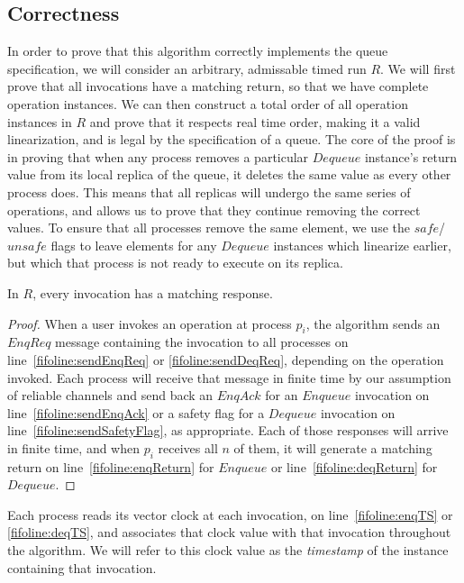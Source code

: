 \documentclass[a4paper,anonymous,USenglish]{lipics-v2021} %
\theoremstyle{definition}
\begin{document}
\subsection{Correctness}
In order to prove that this algorithm correctly implements the queue specification, we will consider an arbitrary, admissable timed run $R$.  We will first prove that all invocations have a matching return, so that we have complete operation instances.  We can then construct a total order of all operation instances in $R$ and prove that it respects real time order, making it a valid linearization, and is legal by the specification of a queue.  The core of the proof is in proving that when any process removes a particular $Dequeue$ instance's return value from its local replica of the queue, it deletes the same value as every other process does.  This means that all replicas will undergo the same series of operations, and allows us to prove that they continue removing the correct values.  To ensure that all processes remove the same element, we use the $safe$/$unsafe$ flags to leave elements for any $Dequeue$ instances which linearize earlier, but which that process is not ready to execute on its replica.

\begin{lemma}
  In $R$, every invocation has a matching response.
\end{lemma}

\begin{proof}
When a user invokes an operation at process $p_i$, the algorithm sends an $EnqReq$ message containing the invocation to all processes on line~\ref{fifoline:sendEnqReq} or \ref{fifoline:sendDeqReq}, depending on the operation invoked.  Each process will receive that message in finite time by our assumption of reliable channels and send back an $EnqAck$ for an $Enqueue$ invocation on line~\ref{fifoline:sendEnqAck} or a safety flag for a $Dequeue$ invocation on line~\ref{fifoline:sendSafetyFlag}, as appropriate.  Each of those responses will arrive in finite time, and when $p_i$ receives all $n$ of them, it will generate a matching return on line~\ref{fifoline:enqReturn} for $Enqueue$ or line~\ref{fifoline:deqReturn} for $Dequeue$.
\end{proof}

Each process reads its vector clock at each invocation, on line~\ref{fifoline:enqTS} or \ref{fifoline:deqTS}, and associates that clock value with that invocation throughout the algorithm.  We will refer to this clock value as the \emph{timestamp} of the instance containing that invocation.
\end{document}
